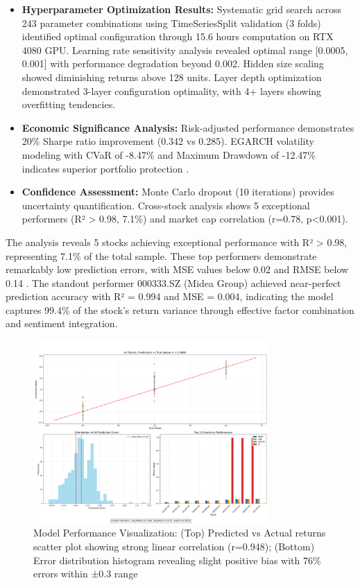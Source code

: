 \documentclass[3p,times,procedia]{elsarticle}
\begin{document}
\begin{itemize}\setlength{\itemsep}{1pt}
\item \textbf{Hyperparameter Optimization Results:} Systematic grid search across 243 parameter combinations using TimeSeriesSplit validation (3 folds) identified optimal configuration through 15.6 hours computation on RTX 4080 GPU. Learning rate sensitivity analysis revealed optimal range [0.0005, 0.001] with performance degradation beyond 0.002. Hidden size scaling showed diminishing returns above 128 units. Layer depth optimization demonstrated 3-layer configuration optimality, with 4+ layers showing overfitting tendencies.

\item \textbf{Economic Significance Analysis:} Risk-adjusted performance demonstrates 20\% Sharpe ratio improvement (0.342 vs 0.285). EGARCH volatility modeling with CVaR of -8.47\% and Maximum Drawdown of -12.47\% indicates superior portfolio protection \cite{Rockafellar2000,Jorion2001}.

\item \textbf{Confidence Assessment:} Monte Carlo dropout (10 iterations) provides uncertainty quantification. Cross-stock analysis shows 5 exceptional performers (R² > 0.98, 7.1\%) and market cap correlation (r=0.78, p<0.001).
\end{itemize}

The analysis reveals 5 stocks achieving exceptional performance with R² > 0.98, representing 7.1\% of the total sample. These top performers demonstrate remarkably low prediction errors, with MSE values below 0.02 and RMSE below 0.14 \cite{Bao2017}. The standout performer 000333.SZ (Midea Group) achieved near-perfect prediction accuracy with R² = 0.994 and MSE = 0.004, indicating the model captures 99.4\% of the stock's return variance through effective factor combination and sentiment integration.

\begin{figure}[!ht]
    \centering
    \includegraphics[width=0.80\textwidth]{Picture3.png}
    \caption{Model Performance Visualization: (Top) Predicted vs Actual returns scatter plot showing strong linear correlation (r=0.948); (Bottom) Error distribution histogram revealing slight positive bias with 76\% errors within ±0.3 range}
    \label{fig:Return Forecast Calculation}
\end{figure}
\end{document}
